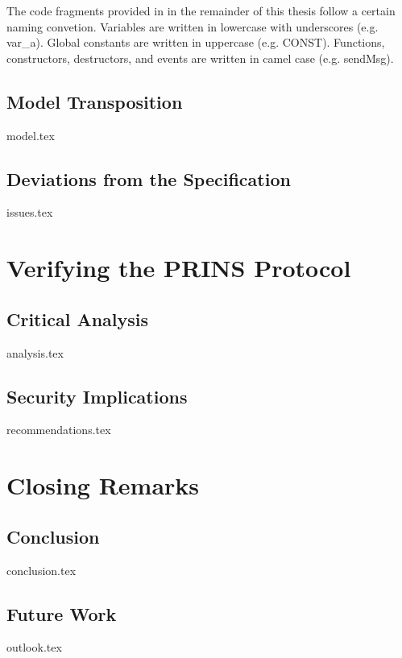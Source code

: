 \documentclass[a4paper,12pt,twoside]{report}
\begin{document}
The code fragments provided in in the remainder of this thesis follow a certain naming convetion.
Variables are written in lowercase with underscores (e.g.  {\sffamily var\_a}).
Global constants are written in uppercase (e.g.  {\sffamily CONST}).
Functions, constructors, destructors, and events are written in camel case (e.g.  {\sffamily sendMsg}).

\section{Model Transposition}
\label{sec:model}
{model.tex}

\section{Deviations from the Specification}
\label{sec:issues}
{issues.tex}

\clearpage

\chapter{Verifying the PRINS Protocol}
\label{chap:verification}

\section{Critical Analysis}
\label{sec:analysis}
{analysis.tex}

\section{Security Implications}
\label{sec:implications}
{recommendations.tex}

\clearpage

\chapter{Closing Remarks}
\label{chap:closing}

\section{Conclusion}
\label{sec:conclusion}
{conclusion.tex}

\section{Future Work}
\label{sec:outlook}
{outlook.tex}
\end{document}
